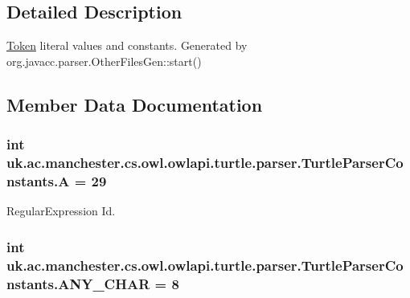 \subsection{Detailed Description}
\hyperlink{classuk_1_1ac_1_1manchester_1_1cs_1_1owl_1_1owlapi_1_1turtle_1_1parser_1_1_token}{Token} literal values and constants. Generated by org.\-javacc.\-parser.\-Other\-Files\-Gen\-::start() 

\subsection{Member Data Documentation}
\hypertarget{interfaceuk_1_1ac_1_1manchester_1_1cs_1_1owl_1_1owlapi_1_1turtle_1_1parser_1_1_turtle_parser_constants_a794739c812f28f252e41e49fe3f50cfc}{
\subsubsection[{A}]{\setlength{\rightskip}{0pt plus 5cm}int uk.\-ac.\-manchester.\-cs.\-owl.\-owlapi.\-turtle.\-parser.\-Turtle\-Parser\-Constants.\-A = 29}}\label{interfaceuk_1_1ac_1_1manchester_1_1cs_1_1owl_1_1owlapi_1_1turtle_1_1parser_1_1_turtle_parser_constants_a794739c812f28f252e41e49fe3f50cfc}
Regular\-Expression Id. \hypertarget{interfaceuk_1_1ac_1_1manchester_1_1cs_1_1owl_1_1owlapi_1_1turtle_1_1parser_1_1_turtle_parser_constants_ac79752568b25e8a9ea95450990f03d6e}{
\subsubsection[{A\-N\-Y\-\_\-\-C\-H\-A\-R}]{\setlength{\rightskip}{0pt plus 5cm}int uk.\-ac.\-manchester.\-cs.\-owl.\-owlapi.\-turtle.\-parser.\-Turtle\-Parser\-Constants.\-A\-N\-Y\-\_\-\-C\-H\-A\-R = 8}}\label{interfaceuk_1_1ac_1_1manchester_1_1cs_1_1owl_1_1owlapi_1_1turtle_1_1parser_1_1_turtle_parser_constants_ac79752568b25e8a9ea95450990f03d6e}
